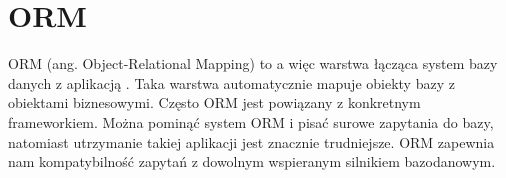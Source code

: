 \section{ORM}

ORM (ang. Object-Relational Mapping) to a więc warstwa łącząca system bazy danych z aplikacją \cite{5365905}.
Taka warstwa automatycznie mapuje obiekty bazy z obiektami biznesowymi.
Często ORM jest powiązany z konkretnym frameworkiem.
Można pominąć system ORM i pisać surowe zapytania do bazy, natomiast utrzymanie takiej aplikacji jest znacznie trudniejsze.
ORM zapewnia nam kompatybilność zapytań z dowolnym wspieranym silnikiem bazodanowym.